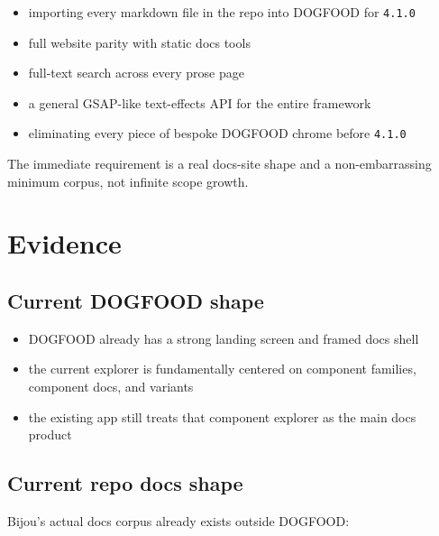 \begin{itemize}
\tightlist
\item
  importing every markdown file in the repo into DOGFOOD for \texttt{4\allowbreak{}.\allowbreak{}1\allowbreak{}.\allowbreak{}0}
\item
  full website parity with static docs tools
\item
  full-text search across every prose page
\item
  a general GSAP-like text-effects API for the entire framework
\item
  eliminating every piece of bespoke DOGFOOD chrome before \texttt{4\allowbreak{}.\allowbreak{}1\allowbreak{}.\allowbreak{}0}
\end{itemize}

The immediate requirement is a real docs-site shape and a non-embarrassing minimum corpus, not infinite scope growth.

\section{Evidence}\label{record-082-evidence}

\subsection{Current DOGFOOD shape}\label{record-082-current-dogfood-shape}

\begin{itemize}
\tightlist
\item
  DOGFOOD already has a strong landing screen and framed docs shell
\item
  the current explorer is fundamentally centered on component families, component docs, and variants
\item
  the existing app still treats that component explorer as the main docs product
\end{itemize}

\subsection{Current repo docs shape}\label{record-082-current-repo-docs-shape}

Bijou's actual docs corpus already exists outside DOGFOOD:

